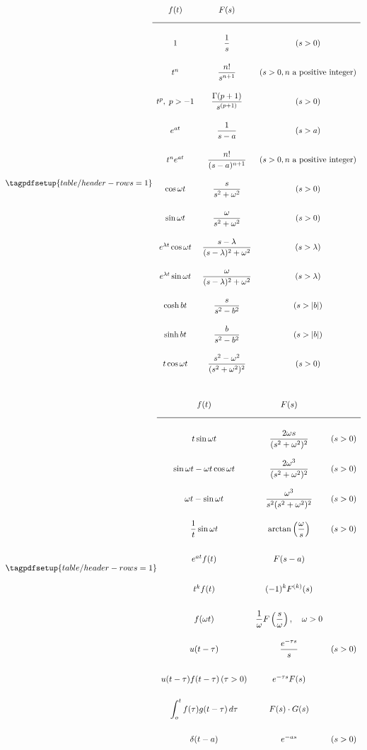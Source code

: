 \[
\tagpdfsetup{table/header-rows={1}}
\renewcommand{\arraystretch}{3}
\begin{array}{ccc}
f(t) & F(s) &  \\\midrule
  1  &  \displaystyle{\frac{1}{s}} & (s > 0) \\
  t^n  &  \displaystyle{\frac{n!}{s^{n+1}}}  & (s > 0, n \text{ a positive integer}) \\
  t^p,\;  p > -1  &
\displaystyle{\frac{\Gamma (p+1)}{s^{(p+1)}}} & (s>0) \\
  e^{at}  &  \displaystyle{\frac{1 }{s-a}}  & (s > a) \\
  t^ne^{at}  &  \displaystyle{\frac{n! }{(s-a)^{n+1}}}  & (s > 0, n \text{ a positive integer}) \\
  \cos \omega t  & \displaystyle{\frac{s }{s^2+\omega^2}}  & (s > 0) \\
\sin\omega t  & \displaystyle{\frac{\omega }{s^2+\omega^2}}  & (s > 0) \\
  e^{\lambda t} \cos \omega t  &
  \displaystyle{\frac{s - \lambda }{(s-\lambda)^2+\omega^2}}  &
   (s > \lambda) \\
 e^{\lambda t} \sin \omega t  &
\displaystyle{\frac{\omega }{(s-\lambda)^2+\omega^2}}  & (s >\lambda) \\
  \cosh bt  &  \displaystyle{\frac{s }{s^2-b^2}}  & (s > |b|)\\
  \sinh bt  &  \displaystyle{\frac{b }{s^2-b^2}}  & (s > |b|) \\
 t \cos \omega t  &
\displaystyle{\frac{s^2-\omega^2 }{(s^2+\omega^2)^2}}  & (s>0)
\end{array}
\]

\[
\tagpdfsetup{table/header-rows={1}}
\renewcommand{\arraystretch}{3}
\begin{array}{ccc}
 f(t)  &  F(s)  &    \\\midrule
  t \sin \omega t  &
\displaystyle{\frac{2\omega s }{(s^2+\omega^2)^2}}  & (s>0)\\
  \sin \omega t -\omega t\cos  \omega t 
 & \displaystyle{\frac{2\omega^3}{(s^2+\omega^2)^2}} & (s>0)\\
  \omega t - \sin  \omega t   &
\displaystyle{\frac{\omega^3 }{s^2(s^2+\omega^2)^2}} & (s>0) \\
  \displaystyle{\frac{1 }{t} \sin  \omega t }
& \displaystyle{\arctan \left(\frac{\omega }{s}\right)} & (s>0) \\
  e^{at}f(t)  &  F(s-a)  & \\
  t^kf(t)  & \displaystyle{{(-1)^kF^{(k)}(s)}}  &  \\
  f(\omega t)  &  \displaystyle{\frac{1}{\omega} F\left(\frac{s }{\omega}\right),  \quad \omega > 0} &  \\
  u(t-\tau)  & \displaystyle{\frac{e^{-\tau s}}{s}} & (s>0)  \\
  u(t-\tau)f(t-\tau)\, (\tau > 0)  & e^{-\tau s}F(s)  &  \\
  \displaystyle{\int^t_o f(\tau)g(t-\tau)\, d\tau}
 &  F(s) \cdot G(s) &  \\
  \delta(t-a)  &  e^{-as} & (s>0)
\end{array}
\]
